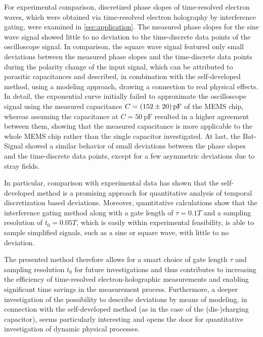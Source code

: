 For experimental comparison, discretized phase slopes of time-resolved electron waves, which were obtained via time-resolved electron holography by interference gating, were examined in \cref{sec:application}. The measured phase slopes for the sine wave signal showed little to no deviation to the time-discrete data points of the oscilloscope signal. In comparison, the square wave signal featured only small deviations between the measured phase slopes and the time-discrete data points during the polarity change of the input signal, which can be attributed to parasitic capacitances and described, in combination with the self-developed method, using a modeling approach, drawing a connection to real physical effects. In detail, the exponential curve initially failed to approximate the oscilloscope signal using the measured capacitance $C = \SI{152 \pm 20}{\pico\farad}$ of the MEMS chip, whereas assuming the capacitance at $C = \SI{50}{\pico\farad}$ resulted in a higher agreement between them, showing that the measured capacitance is more applicable to the whole MEMS chip rather than the single capacitor investigated. At last, the Bat-Signal showed a similar behavior of small deviations between the phase slopes and the time-discrete data points, except for a few asymmetric deviations due to stray fields.

In particular, comparison with experimental data has shown that the self-developed method is a promising approach for quantitative analysis of temporal discretization based deviations. Moreover, quantitative calculations show that the interference gating method along with a gate length of $\tau = 0.1T$ and a sampling resolution of $t_0 = 0.05T$, which is easily within experimental feasibility, is able to sample simplified signals, such as a sine or square wave, with little to no deviation.

The presented method therefore allows for a smart choice of gate length $\tau$ and sampling resolution $t_0$ for future investigations and thus contributes to increasing the efficiency of time-resolved electron-holographic measurements and enabling significant time savings in the measurement process. Furthermore, a deeper investigation of the possibility to describe deviations by means of modeling, in connection with the self-developed method (as in the case of the (dis-)charging capacitor), seems particularly interesting and opens the door for quantitative investigation of dynamic physical processes.
